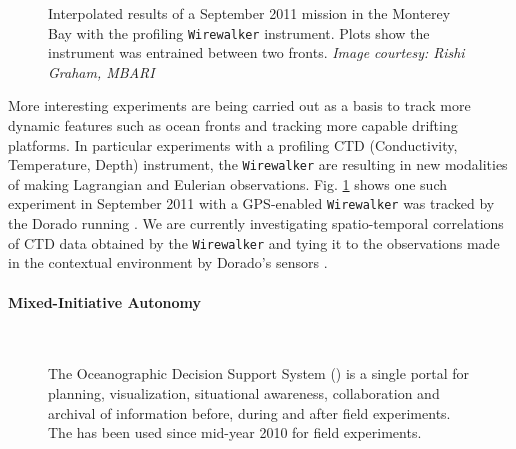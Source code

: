 \begin{figure}
\caption{\small Interpolated results of a September 2011 \rx mission
  in the Monterey Bay with the profiling \texttt{Wirewalker}
  \cite{rainville01,pinkel11} instrument. Plots show the instrument
  was entrained between two fronts. \emph{Image courtesy: Rishi
    Graham, MBARI}}
  \label{fig:sept11-wirewalker}
\end{figure}

More interesting experiments are being carried out as a basis to track
more dynamic features such as ocean fronts \cite{fronts11} and
tracking more capable drifting platforms. In particular experiments
with a profiling CTD (Conductivity, Temperature, Depth) instrument,
the \texttt{Wirewalker} \cite{pinkel11} are resulting in new
modalities of making Lagrangian and Eulerian
observations. Fig. \ref{fig:sept11-wirewalker} shows one such
experiment in September 2011 with a GPS-enabled \texttt{Wirewalker}
was tracked by the Dorado running \rxe. We are currently investigating
spatio-temporal correlations \cite{gneiting07} of CTD data obtained by
the \texttt{Wirewalker} and tying it to the observations made in the
contextual environment by Dorado's sensors \cite{graham12}.

\paragraph {Mixed-Initiative Autonomy}

\begin{figure}
  \centering
  \\
\caption{\small The Oceanographic Decision Support System (\ode) is a
  single portal for planning, visualization, situational awareness,
  collaboration and archival of information before, during and after
  field experiments. The \od has been used since mid-year 2010 for
  \can field experiments.}
\label{fig:odss}
\end{figure}

